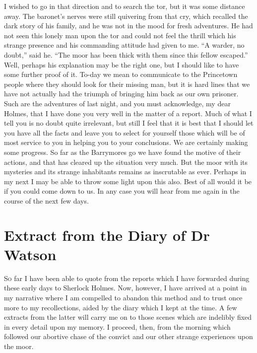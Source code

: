\documentclass[paper=a5,BCOR=7mm,twoside,DIV=calc,12pt,usegeometry,openany,chapterprefix,endperiod,headings=big]{scrbook} %
\begin{document}
I wished to go in that direction and to search the tor, but it was some distance away. The baronet's nerves were still quivering from that cry, which recalled the dark story of his family, and he was not in the mood for fresh adventures. He had not seen this lonely man upon the tor and could not feel the thrill which his strange presence and his commanding attitude had given to me. \enquote{A warder, no doubt,} said he. \enquote{The moor has been thick with them since this fellow escaped.} Well, perhaps his explanation may be the right one, but I should like to have some further proof of it. To-day we mean to communicate to the Princetown people where they should look for their missing man, but it is hard lines that we have not actually had the triumph of bringing him back as our own prisoner. Such are the adventures of last night, and you must acknowledge, my dear Holmes, that I have done you very well in the matter of a report. Much of what I tell you is no doubt quite irrelevant, but still I feel that it is best that I should let you have all the facts and leave you to select for yourself those which will be of most service to you in helping you to your conclusions. We are certainly making some progress. So far as the Barrymores go we have found the motive of their actions, and that has cleared up the situation very much. But the moor with its mysteries and its strange inhabitants remains as inscrutable as ever. Perhaps in my next I may be able to throw some light upon this also. Best of all would it be if you could come down to us. In any case you will hear from me again in the course of the next few days.

\chapter{Extract from the Diary of Dr Watson}
\lettrine[lines=1]{S}{o} far I have been able to quote from the reports which I have forwarded during these early days to Sherlock Holmes. Now, however, I have arrived at a point in my narrative where I am compelled to abandon this method and to trust once more to my recollections, aided by the diary which I kept at the time. A few extracts from the latter will carry me on to those scenes which are indelibly fixed in every detail upon my memory. I proceed, then, from the morning which followed our abortive chase of the convict and our other strange experiences upon the moor.
\vfill
\end{document}
